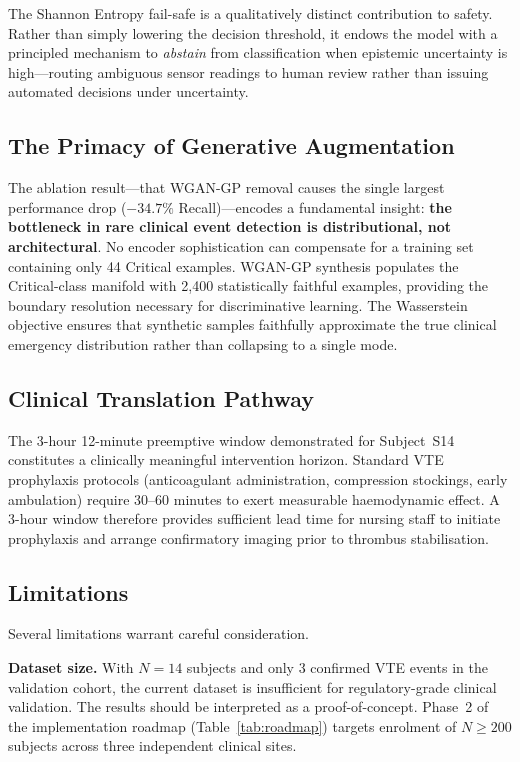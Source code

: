 \documentclass[conference]{IEEEtran}
\begin{document}
The Shannon Entropy fail-safe is a qualitatively distinct contribution
to safety.  Rather than simply lowering the decision threshold, it
endows the model with a principled mechanism to \textit{abstain} from
classification when epistemic uncertainty is high---routing ambiguous
sensor readings to human review rather than issuing automated decisions
under uncertainty.

\subsection{The Primacy of Generative Augmentation}
The ablation result---that WGAN-GP removal causes the single largest
performance drop ($-34.7\%$ Recall)---encodes a fundamental insight:
\textbf{the bottleneck in rare clinical event detection is
distributional, not architectural}.  No encoder sophistication can
compensate for a training set containing only 44 Critical examples.
WGAN-GP synthesis populates the Critical-class manifold with
2{,}400 statistically faithful examples, providing the boundary
resolution necessary for discriminative learning.  The Wasserstein
objective ensures that synthetic samples faithfully approximate the
true clinical emergency distribution rather than collapsing to a
single mode.

\subsection{Clinical Translation Pathway}
The 3-hour 12-minute preemptive window demonstrated for Subject~S14
constitutes a clinically meaningful intervention horizon.  Standard
VTE prophylaxis protocols (anticoagulant administration, compression
stockings, early ambulation) require 30--60 minutes to exert
measurable haemodynamic effect.  A 3-hour window therefore provides
sufficient lead time for nursing staff to initiate prophylaxis and
arrange confirmatory imaging prior to thrombus stabilisation.

\subsection{Limitations}
Several limitations warrant careful consideration.

\textbf{Dataset size.}  With $N = 14$ subjects and only 3 confirmed
VTE events in the validation cohort, the current dataset is
insufficient for regulatory-grade clinical validation.  The results
should be interpreted as a proof-of-concept.  Phase~2 of the
implementation roadmap (Table~\ref{tab:roadmap}) targets enrolment of
$N \geq 200$ subjects across three independent clinical sites.
\end{document}
